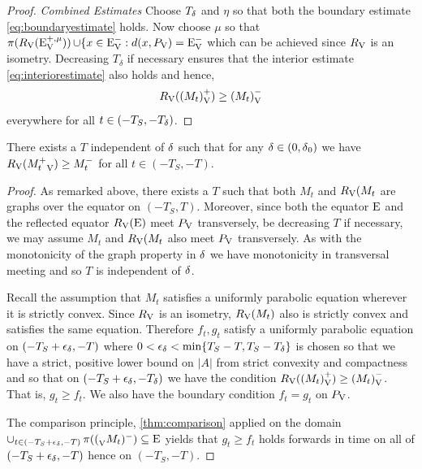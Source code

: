 \documentclass{amsart}
\begin{document}
\begin{proof}
\emph{Combined Estimates}
Choose \(T_{\operatorname{\delta}}\) and \(\eta\) so that both the boundary estimate \cref{eq:boundaryestimate} holds. Now choose \(\mu\) so that \(\operatorname{\pi}(R_{\operatorname{V}}({\operatorname{E}}_{\operatorname{V}}^{+,\mu})) \operatorname{\cup} \{x \in {\operatorname{E}}_{\operatorname{V}}^- : d(x, P_{\operatorname{V}}) = {\operatorname{E}}_{\operatorname{V}}^-\) which can be achieved since \(R_{\operatorname{V}}\) is an isometry. Decreasing \(T_{\delta}\) if necessary ensures that the interior estimate \cref{eq:interiorestimate} also holds and hence,
\[
R_{\operatorname{V}}({(M_t)}_{\operatorname{V}}^+) \geq {(M_t)}_{\operatorname{V}}^-
\]
everywhere for all \(t \in (-T_S, -T_{\operatorname{\delta}})\).
\end{proof}

\begin{lemma}
\label{lem:approximate_symmetrypreserved}
There exists a \(T\) independent of \(\operatorname{\delta}\) such that for any \(\operatorname{\delta} \in (0,\operatorname{\delta}_0)\) we have \(R_{\operatorname{V}}({M_t^+}_{\operatorname{V}}) \geq M_t^-\) for all \(t \in (-T_S, -T)\).
\end{lemma}
\begin{proof}
As remarked above, there exists a \(T\) such that both \(M_t\) and \(R_{\operatorname{V}}(M_t\) are graphs over the equator on \((-T_S, T)\). Moreover, since both the equator \(\operatorname{E}\) and the reflected equator \(R_{\operatorname{V}}(\operatorname{E})\) meet \(P_{\operatorname{V}}\) transversely, be decreasing \(T\) if necessary, we may assume \(M_t\) and \(R_{\operatorname{V}}(M_t\) also meet \(P_{\operatorname{V}}\) transversely. As with the monotonicity of the graph property in \(\operatorname{\delta}\) we have monotonicity in transversal meeting and so \(T\) is independent of \(\operatorname{\delta}\).

Recall the assumption that \(M_t\) satisfies a uniformly parabolic equation wherever it is strictly convex. Since \(R_{\operatorname{V}}\) is an isometry, \(R_{\operatorname{V}}(M_t)\) also is strictly convex and satisfies the same equation. Therefore \(f_t,g_t\) satisfy a uniformly parabolic equation on \((-T_S + \epsilon_{\operatorname{\delta}}, -T)\) where \(0 < \epsilon_{\operatorname{\delta}} < \min\{T_S-T, T_S-T_{\operatorname{\delta}}\}\) is chosen so that we have a strict, positive lower bound on \(|A|\) from strict convexity and compactness and so that on \((-T_S + \epsilon_{\operatorname{\delta}}, -T_{\operatorname{\delta}})\) we have the condition \(R_{\operatorname{V}}({(M_t)}_{\operatorname{V}}^+) \geq {(M_t)}_{\operatorname{V}}^-\). That is, \(g_t \geq f_t\). We also have the boundary condition \(f_t = g_t\) on \(P_{\operatorname{V}}\).

The comparison principle, \cref{thm:comparison} applied on the domain \(\operatorname{\cup}\limits_{t \in (-T_S + \epsilon_{\operatorname{\delta}}, -T)} \operatorname{\pi}({(}_{\operatorname{V}}M_t)^-) \subseteq \operatorname{E}\) yields that \(g_t \geq f_t\) holds forwards in time on all of \((-T_S + \epsilon_{\operatorname{\delta}}, -T)\) hence on \((-T_S, -T)\).
\end{proof}
\end{document}
